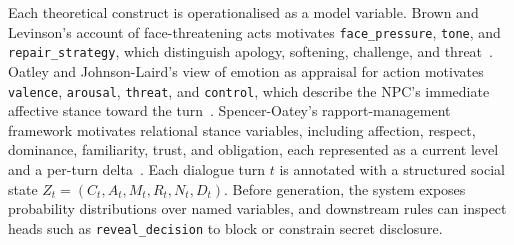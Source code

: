 \documentclass[11pt]{article}
\begin{document}
Each theoretical construct is operationalised as a model variable.
Brown and Levinson's account of face-threatening acts motivates 
\texttt{face\_pressure}, \texttt{tone}, and \texttt{repair\_strategy}, 
which distinguish apology, softening, challenge, and threat~\cite{brown1987politeness}. 
Oatley and Johnson-Laird's view of emotion as appraisal for action motivates 
\texttt{valence}, \texttt{arousal}, \texttt{threat}, and \texttt{control}, 
which describe the NPC's immediate affective stance toward the turn~\cite{oatley1987towards}. 
Spencer-Oatey's rapport-management framework motivates relational stance variables, 
including affection, respect, dominance, familiarity, trust, and obligation, each represented 
as a current level and a per-turn delta~\cite{spencer2008politeness}. 
Each dialogue turn $t$ is annotated with a structured social state $Z_t = (C_t, A_t, M_t, R_t, N_t, D_t)$.
Before generation, the system exposes probability distributions over named variables, and downstream rules can inspect heads such as \texttt{reveal\_decision} to block or constrain secret disclosure. 





\begin{table}[t]
\centering
\caption{Structured social state schema $Z_t$. Each field is a classification target predicted by the 29-head model. Stance dimensions ($R_t$) each have a level (5-class ordinal) and a per-turn delta (5-class ordinal).}
\label{tab:schema}
\small
{}
\end{table}
\end{document}
